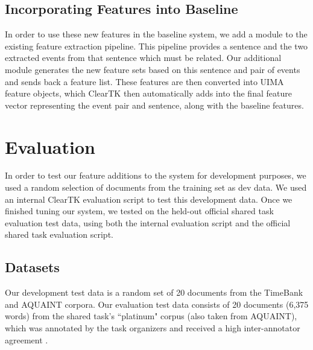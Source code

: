\documentclass[11pt]{article}
\begin{document}
\subsection{Incorporating Features into Baseline}

In order to use these new features in the baseline system, we add a module to the existing feature extraction pipeline. This pipeline provides a sentence and the two extracted events from that sentence which must be related. Our additional module generates the new feature sets based on this sentence and pair of events and sends back a feature list. These features are then converted into UIMA feature objects, which ClearTK then automatically adds into the final feature vector representing the event pair and sentence, along with the baseline features.

\section{Evaluation}
\label{eval}

In order to test our feature additions to the system for development purposes, we used a random selection of documents from the training set as dev data. We used an internal ClearTK evaluation script to test this development data. Once we finished tuning our system, we tested on the held-out official shared task evaluation test data, using both the internal evaluation script and the official shared task evaluation script.

\subsection{Datasets}

Our development test data is a random set of 20 documents from the TimeBank and AQUAINT corpora. Our evaluation test data consists of 20 documents (6,375 words) from the shared task's ``platinum" corpus (also taken from AQUAINT), which was annotated by the task organizers and received a high inter-annotator agreement \cite{UzZaman:13}.
\end{document}
